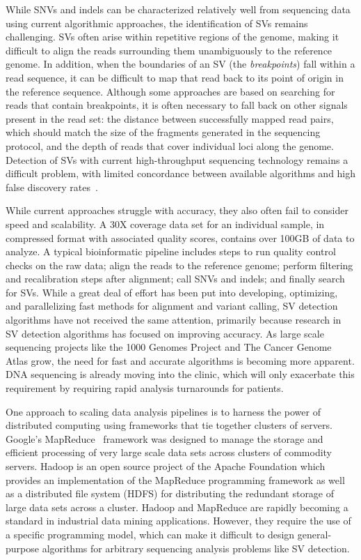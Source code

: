 While SNVs and indels can be characterized relatively well from sequencing data using current algorithmic approaches, the identification of SVs remains challenging. SVs often arise within repetitive regions of the genome, making it difficult to align the reads surrounding them unambiguously to the reference genome. In addition, when the boundaries of an SV (the \emph{breakpoints}) fall within a read sequence, it can be difficult to map that read back to its point of origin in the reference sequence. Although some approaches are based on searching for reads that contain breakpoints, it is often necessary to fall back on other signals present in the read set: the distance between successfully mapped read pairs, which should match the size of the fragments generated in the sequencing protocol, and the depth of reads that cover individual loci along the genome. Detection of SVs with current high-throughput sequencing technology remains a difficult problem, with limited concordance between available algorithms and high false discovery rates~\cite{Mills:2011p1611}.

While current approaches struggle with accuracy, they also often fail to consider speed and scalability. A 30X coverage data set for an individual sample, in compressed format with associated quality scores, contains over 100GB of data to analyze. A typical bioinformatic pipeline includes steps to run quality control checks on the raw data; align the reads to the reference genome; perform filtering and recalibration steps after alignment; call SNVs and indels; and finally search for SVs. While a great deal of effort has been put into developing, optimizing, and parallelizing fast methods for alignment and variant calling, SV detection algorithms have not received the same attention, primarily because research in SV detection algorithms has focused on improving accuracy. As large scale sequencing projects like the 1000 Genomes Project and The Cancer Genome Atlas grow, the need for fast and accurate algorithms is becoming more apparent. DNA sequencing is already moving into the clinic, which will only exacerbate this requirement by requiring rapid analysis turnarounds for patients.

One approach to scaling data analysis pipelines is to harness the power of distributed computing using frameworks that tie together clusters of servers. Google's MapReduce~\cite{Dean:2008p277} framework was designed to manage the storage and efficient processing of very large scale data sets across clusters of commodity servers. Hadoop is an open source project of the Apache Foundation which provides an implementation of the MapReduce programming framework as well as a distributed file system (HDFS) for distributing the redundant storage of large data sets across a cluster. Hadoop and MapReduce are rapidly becoming a standard in industrial data mining applications. However, they require the use of a specific programming model, which can make it difficult to design general-purpose algorithms for arbitrary sequencing analysis problems like SV detection. 


